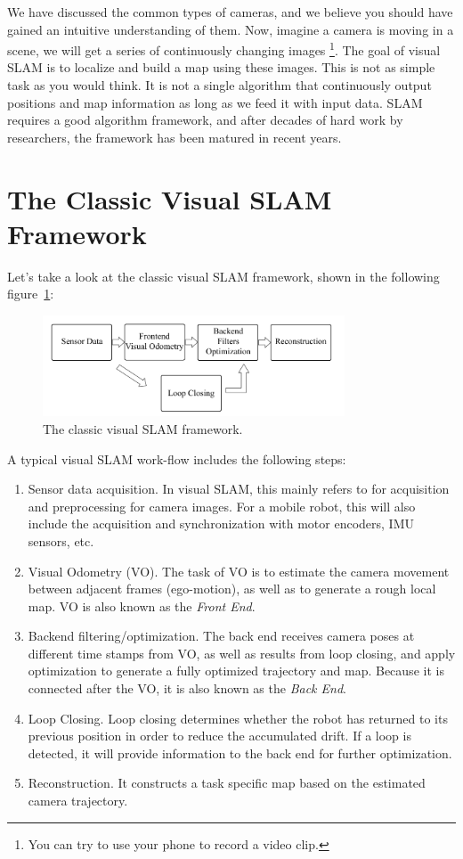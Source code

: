 We have discussed the common types of cameras, and we believe you should have gained an intuitive understanding of them. Now, imagine a camera is moving in a scene, we will get a series of continuously changing images \footnote{You can try to use your phone to record a video clip.}. The goal of visual SLAM is to localize and build a map using these images. This is not as simple task as you would think. It is not a single algorithm that continuously output positions and map information as long as we feed it with input data. SLAM requires a good algorithm framework, and after decades of hard work by researchers, the framework has been matured in recent years.

\section{The Classic Visual SLAM Framework}

Let's take a look at the classic visual SLAM framework, shown in the following figure~\ref{fig:workflow}:

\begin{figure}
    \centering
    \includegraphics[width=0.8\textwidth]{./resources/whatIsSLAM/workflow.pdf}
    \caption{The classic visual SLAM framework.}
    \label{fig:workflow}
\end{figure}

A typical visual SLAM work-flow includes the following steps:
\begin{enumerate}
\item{Sensor data acquisition}. In visual SLAM, this mainly refers to for acquisition and preprocessing for camera images. For a mobile robot, this will also include the acquisition and synchronization with motor encoders, IMU sensors, etc.
\item{Visual Odometry (VO)}. The task of VO is to estimate the camera movement between adjacent frames (ego-motion), as well as to generate a rough local map. VO is also known as the \emph{Front End}.
\item {Backend filtering/optimization}. The back end receives camera poses at different time stamps from VO, as well as results from loop closing, and apply optimization to generate a fully optimized trajectory and map. Because it is connected after the VO, it is also known as the \emph{Back End}.
\item {Loop Closing}. Loop closing determines whether the robot has returned to its previous position in order to reduce the accumulated drift. If a loop is detected, it will provide information to the back end for further optimization.
\item {Reconstruction}. It constructs a task specific map based on the estimated camera trajectory.
\end{enumerate}

